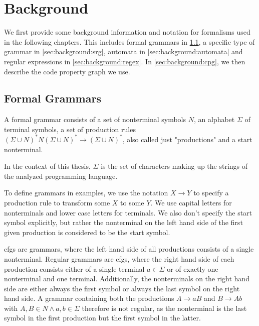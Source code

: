 \chapter{Background}
\label{chapter:Background}
\begin{comment}
What is the knowledge a undergrad student needs so that he/she can understand
your thesis? You can assume some familiarity with the very broad topic. E.g. if
you write a thesis in the area of software analysis, you do not have to explain
static/dynamic analysis as such (this is boring!). If you're a crypto guy, don't
explain AES in detail unless you try to break it in your thesis. If I stumble
across a word/term in your thesis and don't understand it, this is where I would
look it up (or on google).

Probably approx. 3-10 pages
\end{comment}

We first provide some background information and notation for formalisms used in the following chapters. This includes formal grammars in \ref{sec:background:grammars}, a specific type of grammar in \ref{sec:background:srg}, automata in \ref{sec:background:automata} and regular expressions in \ref{sec:background:regex}. In \ref{sec:background:cpg}, we then describe the code property graph we use.

\section{Formal Grammars}\label{sec:background:grammars}

A formal grammar consists of a set of nonterminal symbols $N$, an alphabet $\Sigma$ of terminal symbols, a set of production rules $(\Sigma \cup N)^*N(\Sigma \cup N)^* \rightarrow (\Sigma \cup N)^*$, also called just "productions" and a start nonterminal.

In the context of this thesis, $\Sigma$ is the set of characters making up the strings of the analyzed programming language.

To define grammars in examples, we use the notation $X \rightarrow Y$ to specify a production rule to transform some $X$ to some $Y$.
We use capital letters for nonterminals and lower case letters for terminals. We also don't specify the start symbol explicitly, but rather the nonterminal on the left hand side of the first given production is considered to be the start symbol.

\Acfp{cfg} are grammars, where the left hand side of all productions consists of a single nonterminal.
Regular grammars are \acp{cfg}, where the right hand side of each production consists either of a single terminal $a \in \Sigma$ or of exactly one nonterminal and one terminal. Additionally, the nonterminals on the right hand side are either always the first symbol or always the last symbol on the right hand side. A grammar containing both the productions $A \rightarrow aB$ and $B \rightarrow Ab$ with $A, B \in N \land a, b \in \Sigma$ therefore is not regular, as the nonterminal is the last symbol in the first production but the first symbol in the latter.

